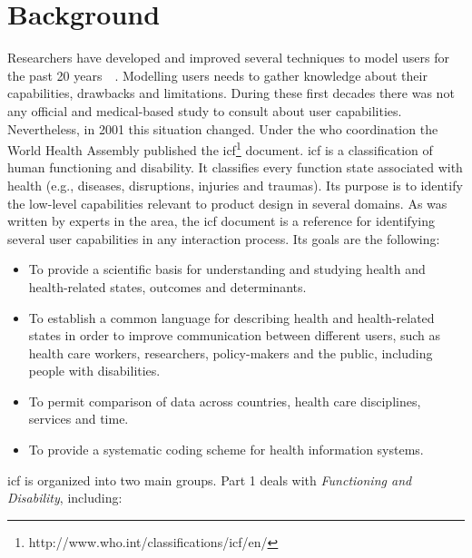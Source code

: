 \section{Background}
\label{sec:background}

Researchers have developed and improved several techniques to model users for 
the past 20 years~\citep{petrelli_user_centered_1999}~\citep{fink_adaptable_1997}. 
Modelling users needs to gather knowledge about their capabilities, drawbacks 
and limitations. During these first decades there was not any official and 
medical-based study to consult about user capabilities. Nevertheless, in 2001 
this situation changed. Under the \ac{who} coordination the World Health Assembly 
published the \ac{icf}\footnote{http://www.who.int/classifications/icf/en/} 
document. \ac{icf} is a classification of human functioning and disability. It 
classifies every function state associated with health (e.g., diseases, 
disruptions, injuries and traumas). Its purpose is to identify the low-level 
capabilities relevant to product design in several domains. As was written by 
experts in the area, the \ac{icf} document is a reference for identifying several 
user capabilities in any interaction process. Its goals are the following:

\begin{itemize}
  \item To provide a scientific basis for understanding and studying health and
  health-related states, outcomes and determinants.
  \item To establish a common language for describing health and health-related 
  states in order to improve communication between different users, such as health 
  care workers, researchers, policy-makers and the public, including people with 
  disabilities.
  \item To permit comparison of data across countries, health care disciplines,
  services and time.
  \item To provide a systematic coding scheme for health information systems.
\end{itemize}

\ac{icf} is organized into two main groups. Part 1 deals with \textit{Functioning 
and Disability}, including:

